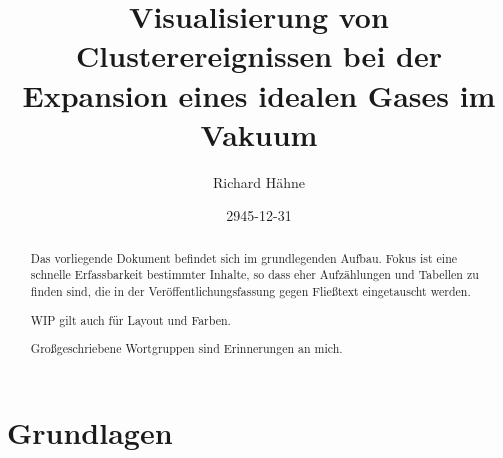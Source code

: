 







\subject{Arbeitsname Bachelorarbeit}
\title{Visualisierung von Clusterereignissen bei der Expansion eines idealen Gases im Vakuum}

\author{%
	Richard Hähne
}

\date{2945-12-31}


\maketitle

\begin{abstract}
	Das vorliegende Dokument befindet sich im grundlegenden Aufbau. Fokus ist eine schnelle Erfassbarkeit bestimmter Inhalte, so dass eher Aufzählungen und Tabellen zu finden sind, die in der Veröffentlichungsfassung gegen Fließtext eingetauscht werden.
	
	WIP gilt auch für Layout und Farben.
	
	Großgeschriebene Wortgruppen sind Erinnerungen an mich.
\end{abstract}


\printacronyms[style=acrotabu] \printsymbols[style=symblongtabu]



\chapter{Grundlagen}

